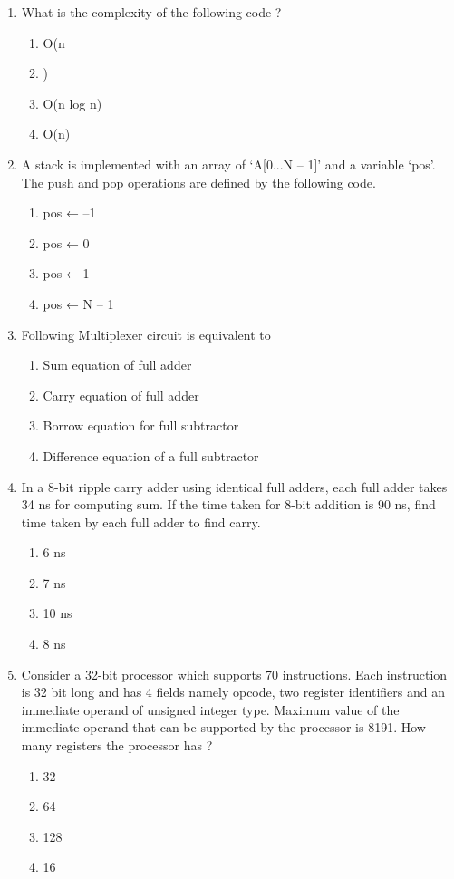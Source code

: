 \documentclass[12pt]{article}
\begin{document}
\begin{enumerate}
\item[51.] What is the complexity of the following code ?
\begin{enumerate}[label=\Alph*.]
  \item Ο(n
  \item )
  \item Ο(n log n)
  \item Ο(n)
\end{enumerate}

\item[52.] A stack is implemented with an array of ‘A[0...N – 1]’ and a variable ‘pos’. The push and pop operations are defined by the following code.
\begin{enumerate}[label=\Alph*.]
  \item pos ← –1
  \item pos ← 0
  \item pos ← 1
  \item pos ← N – 1
\end{enumerate}

\item[53.] Following Multiplexer circuit is equivalent to
\begin{enumerate}[label=\Alph*.]
  \item Sum equation of full adder
  \item Carry equation of full adder
  \item Borrow equation for full subtractor
  \item Difference equation of a full subtractor
\end{enumerate}

\item[54.] In a 8-bit ripple carry adder using identical full adders, each full adder takes 34 ns for computing sum. If the time taken for 8-bit addition is 90 ns, find time taken by each full adder to find carry.
\begin{enumerate}[label=\Alph*.]
  \item 6 ns
  \item 7 ns
  \item 10 ns
  \item 8 ns
\end{enumerate}

\item[55.] Consider a 32-bit processor which supports 70 instructions. Each instruction is 32 bit long and has 4 fields namely opcode, two register identifiers and an immediate operand of unsigned integer type. Maximum value of the immediate operand that can be supported by the processor is 8191. How many registers the processor has ?
\begin{enumerate}[label=\Alph*.]
  \item 32
  \item 64
  \item 128
  \item 16
\end{enumerate}


\end{enumerate}
\end{document}
